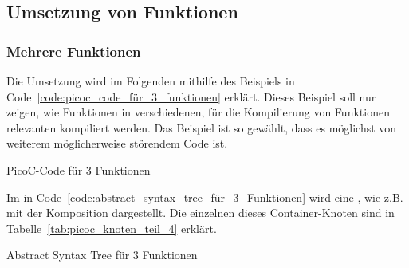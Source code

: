 
\subsection{Umsetzung von Funktionen}
\subsubsection{Mehrere Funktionen}

Die Umsetzung  wird im Folgenden mithilfe des Beispiels in Code~\ref{code:picoc_code_für_3_funktionen} erklärt. Dieses Beispiel soll nur zeigen, wie Funktionen in verschiedenen, für die Kompilierung von Funktionen relevanten  kompiliert werden. Das Beispiel ist so gewählt, dass es möglichst  von weiterem möglicherweise störendem Code ist.

\begin{code}
  \centering
  \caption{PicoC-Code für 3 Funktionen}
  \label{code:picoc_code_für_3_funktionen}
\end{code}

Im  in Code~\ref{code:abstract_syntax_tree_für_3_Funktionen} wird eine , wie z.B.  mit der Komposition  dargestellt. Die einzelnen  dieses Container-Knoten sind in Tabelle~\ref{tab:picoc_knoten_teil_4} erklärt.

\begin{code}
  \centering
  \caption{Abstract Syntax Tree für 3 Funktionen}
  \label{code:abstract_syntax_tree_für_3_Funktionen}
\end{code}

